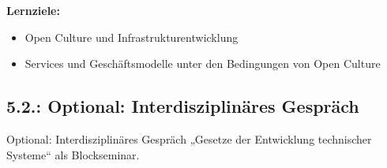 \documentclass[11pt,a4paper]{article}
\begin{document}
\textbf{Lernziele:}
\begin{itemize}[noitemsep]
\item Open Culture und Infrastrukturentwicklung
\item Services und Geschäftsmodelle unter den Bedingungen von Open Culture
\end{itemize}

\subsection{5.2.: Optional: Interdisziplinäres Gespräch} 

Optional: Interdisziplinäres Gespräch „Gesetze der Entwicklung technischer
Systeme“ als Blockseminar.
\end{document}
